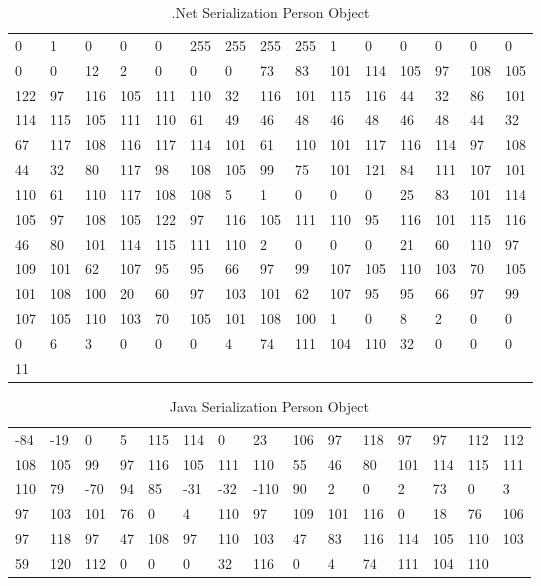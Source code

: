\begin{table}[]
\centering
\begin{tabular}{lllllllllllllll}
0 & 1 & 0 & 0 & 0 & 255 & 255 & 255 & 255 & 1 & 0 & 0 & 0 & 0 & 0 \\
0 & 0 & 12 & 2 & 0 & 0 & 0 & 73 & 83 & 101 & 114 & 105 & 97 & 108 & 105  \\
122 & 97 & 116 & 105 & 111 & 110 & 32 & 116 & 101 & 115 & 116 & 44 & 32 & 86 & 101\\
114 & 115 & 105 & 111 & 110 & 61 & 49 & 46 & 48 & 46 & 48 & 46 & 48 & 44 & 32 \\
67 & 117 & 108 & 116 & 117 & 114 & 101 & 61 & 110 & 101 & 117 & 116 & 114 & 97 & 108 \\
44 & 32 & 80 & 117 & 98 & 108 & 105 & 99 & 75 & 101 & 121 & 84 & 111 & 107 & 101 \\
110 & 61 & 110 & 117 & 108 & 108 & 5 & 1 & 0 & 0 & 0 & 25 & 83 & 101 & 114 \\
105 & 97 & 108 & 105 & 122 & 97 & 116 & 105 & 111 & 110 & 95 & 116 & 101 & 115 & 116 \\
46 & 80 & 101 & 114 & 115 & 111 & 110 & 2 & 0 & 0 & 0 & 21 & 60 & 110 & 97 \\
109 & 101 & 62 & 107 & 95 & 95 & 66 & 97 & 99 & 107 & 105 & 110 & 103 & 70 & 105 \\
101 & 108 & 100 & 20 & 60 & 97 & 103 & 101 & 62 & 107 & 95 & 95 & 66 & 97 & 99 \\
107 & 105 & 110 & 103 & 70 & 105 & 101 & 108 & 100 & 1 & 0 & 8 & 2 & 0 & 0 \\
0 & 6 & 3 & 0 & 0 & 0 & 4 & 74 & 111 & 104 & 110 & 32 & 0 & 0 & 0 \\
11& & & & & & & & & & & & & & &
\end{tabular}
\caption[.Net Serialization Person Object]{.Net Serialization Person Object}
\label{tab:netserilazitaon}
\end{table}


\begin{table}[]
\centering
\begin{tabular}{lllllllllllllll}
  -84 & -19 & 0 & 5 & 115 & 114 & 0 & 23 & 106 & 97 & 118 & 97 & 97 & 112 & 112 \\
  108 & 105 & 99 & 97 & 116 & 105 & 111 & 110 & 55 & 46 & 80 & 101 & 114 & 115 & 111 \\
  110 & 79 & -70 & 94 & 85 & -31 & -32 & -110 & 90 & 2 & 0 & 2 & 73 & 0 & 3 \\
  97 & 103 & 101 & 76 & 0 & 4 & 110 & 97 & 109 & 101 & 116 & 0 & 18 & 76 & 106 \\
  97 & 118 & 97 & 47 & 108 & 97 & 110 & 103 & 47 & 83 & 116 & 114 & 105 & 110 & 103 \\
  59 & 120 & 112 & 0 & 0 & 0 & 32 & 116 & 0 & 4 & 74 & 111 & 104 & 110 \\
\end{tabular}
\caption[Java Serialization Person Object]{Java Serialization Person Object}
\label{tab:javaserilazitaon}
\end{table}

